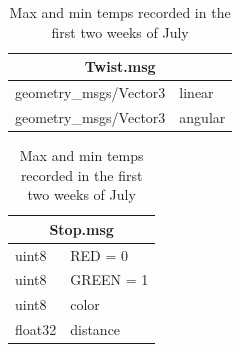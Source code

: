 \begin{table}[htbp]
	\begin{subtable}[h]{0.40\textwidth}
		\centering
		\begin{tabular}{| p{4cm}| p{1.5cm} |}
            \hline 
            \multicolumn{2}{|c|}{Twist.msg} \\
            \hline
			geometry\_msgs/Vector3 & linear \\
			geometry\_msgs/Vector3 & angular \\
            \hline  
		\end{tabular}
		\caption{First Week}
		\label{tab:week1}
	\end{subtable}
	\hfill
	\begin{subtable}[h]{0.40\textwidth}
		\centering
		\begin{tabular}{| p{1.5cm}| p{2.5cm} |}
            \hline 
            \multicolumn{2}{|c|}{Stop.msg} \\
            \hline
			uint8 & RED = 0 \\
            uint8 & GREEN = 1 \\
            uint8 & color \\
            float32 & distance \\
            \hline  
		\end{tabular}
		\caption{First Week}
		\label{tab:week1}
	\end{subtable}
	\caption{Max and min temps recorded in the first two weeks of July}
	\label{tab:temps}
\end{table}

